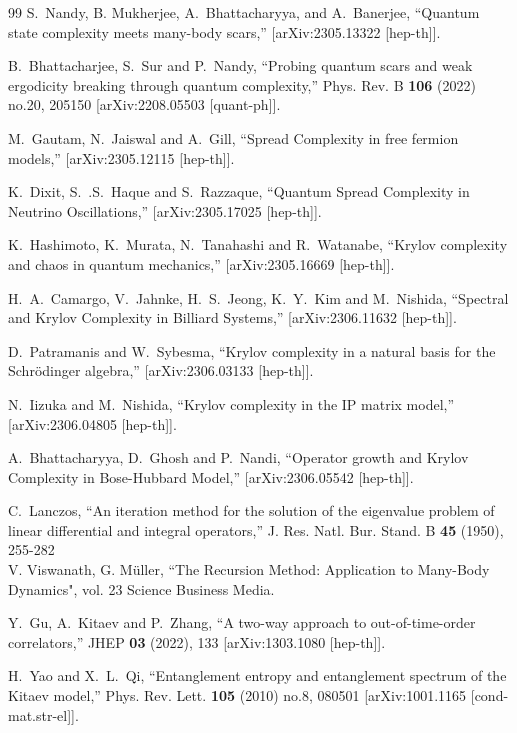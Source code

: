 \documentclass[aps,prl,twocolumn,showpacs,preprintnumbers,amsmath,amssymb]{revtex4-1}
\begin{document}
\begin{thebibliography}{99}
S.~Nandy, B. Mukherjee, A.~Bhattacharyya, and A.~Banerjee,
``Quantum state complexity meets many-body scars,''
[arXiv:2305.13322 [hep-th]].

B.~Bhattacharjee, S.~Sur and P.~Nandy,
``Probing quantum scars and weak ergodicity breaking through quantum complexity,''
Phys. Rev. B \textbf{106} (2022) no.20, 205150
[arXiv:2208.05503 [quant-ph]].

M.~Gautam, N.~Jaiswal and A.~Gill, 
``Spread Complexity in free fermion models,''
[arXiv:2305.12115 [hep-th]].

K.~Dixit, S.~.S.~Haque and S.~Razzaque, 
``Quantum Spread Complexity in Neutrino Oscillations,''
[arXiv:2305.17025 [hep-th]].

K.~Hashimoto, K.~Murata, N.~Tanahashi and R.~Watanabe, 
``Krylov complexity and chaos in quantum mechanics,''
[arXiv:2305.16669 [hep-th]].

H.~A.~Camargo, V.~Jahnke, H.~S.~Jeong, K.~Y.~Kim and M.~Nishida,
``Spectral and Krylov Complexity in Billiard Systems,''
[arXiv:2306.11632 [hep-th]].

D.~Patramanis and W.~Sybesma, 
``Krylov complexity in a natural basis for the Schr\"odinger algebra,''
[arXiv:2306.03133 [hep-th]].

N.~Iizuka and M.~Nishida,
``Krylov complexity in the IP matrix model,''
[arXiv:2306.04805 [hep-th]].

A.~Bhattacharyya, D.~Ghosh and P.~Nandi, 
``Operator growth and Krylov Complexity in Bose-Hubbard Model,''
[arXiv:2306.05542 [hep-th]].

C.~Lanczos,
``An iteration method for the solution of the eigenvalue problem of linear differential and integral operators,''
J. Res. Natl. Bur. Stand. B \textbf{45} (1950), 255-282\\
V. Viswanath, G. Müller,
``The Recursion Method: Application to Many-Body Dynamics", vol. 23 Science  Business Media.


Y.~Gu, A.~Kitaev and P.~Zhang, 
``A two-way approach to out-of-time-order correlators,''
JHEP \textbf{03} (2022), 133
[arXiv:1303.1080 [hep-th]].

H.~Yao and X.~L.~Qi,
``Entanglement entropy and entanglement spectrum of the Kitaev model,''
Phys. Rev. Lett. \textbf{105} (2010) no.8, 080501
[arXiv:1001.1165 [cond-mat.str-el]].



\end{thebibliography}
\end{document}

